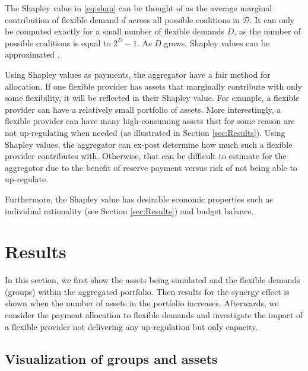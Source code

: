 \documentclass[conference]{IEEEtran}
\begin{document}

The Shapley value  in \eqref{eq:shap} can be thought of as the average marginal contribution of flexible demand $d$ across all possible coalitions in $\mathcal{D}$. It can only be computed exactly for a small number of flexible demands $D$, as the number of possible coalitions is equal to $2^{D} - 1$. As $D$ grows, Shapley values can be approximated \cite{castro2009polynomial}.

Using Shapley values as payments, the aggregator have a fair method for allocation. If one flexible provider has assets that marginally contribute with only some flexibility, it will be reflected in their Shapley value. For example, a flexible provider can have a relatively small portfolio of assets. More interestingly, a flexible provider can have many high-consuming assets that for some reason are not up-regulating when needed (as illustrated in Section \ref{sec:Results}). Using Shapley values, the aggregator can ex-post determine how much such a flexible provider contributes with. Otherwise, that can be difficult to estimate for the aggregator due to the benefit of reserve payment versus risk of not being able to up-regulate.

Furthermore, the Shapley value has desirable economic properties such as individual rationality (see Section \ref{sec:Results}) and budget balance.

\section{Results}\label{chapter3}

In this section, we first show the assets being simulated and the flexible demands (groups) within the aggregated portfolio. Then results for the synergy effect is shown when the number of assets in the portfolio increases. Afterwards, we consider the payment allocation to flexible demands and investigate the impact of a flexible provider not delivering any up-regulation but only capacity.

\subsection{Visualization of groups and assets}
\end{document}
